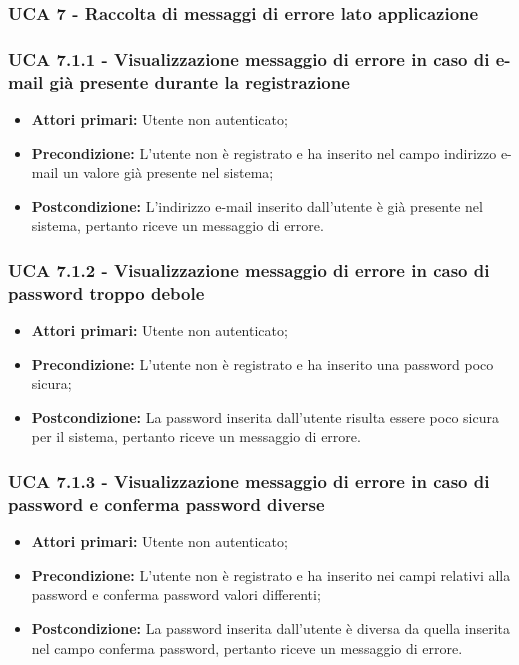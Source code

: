 \newpage
\subsubsection{UCA 7 - Raccolta di messaggi di errore lato applicazione}
\subsubsection{UCA 7.1.1 - Visualizzazione messaggio di errore in caso di e-mail già presente durante la registrazione}%
\begin{itemize}
\item \textbf{Attori primari:} Utente non autenticato;
\item \textbf{Precondizione:} L'utente non è registrato e ha inserito nel campo indirizzo e-mail un valore già presente nel sistema;
\item \textbf{Postcondizione:} L'indirizzo e-mail inserito dall'utente è già presente nel sistema, pertanto riceve un messaggio di errore.
\end{itemize}

\subsubsection{UCA 7.1.2 - Visualizzazione messaggio di errore in caso di password troppo debole}%
\begin{itemize}
\item \textbf{Attori primari:} Utente non autenticato;
\item \textbf{Precondizione:} L'utente non è registrato e ha inserito una password poco sicura;
\item \textbf{Postcondizione:} La password inserita dall'utente risulta essere poco sicura per il sistema, pertanto riceve un messaggio di errore.
\end{itemize}


\subsubsection{UCA 7.1.3 - Visualizzazione messaggio di errore in caso di password e conferma password diverse}%
\begin{itemize}
\item \textbf{Attori primari:} Utente non autenticato;
\item \textbf{Precondizione:} L'utente non è registrato e ha inserito nei campi relativi alla password e conferma password valori differenti;
\item \textbf{Postcondizione:} La password inserita dall'utente è diversa da quella inserita nel campo conferma password, pertanto riceve un messaggio di errore.
\end{itemize}


